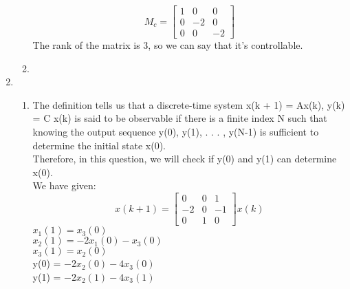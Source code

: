 \documentclass[12pt,a4paper, margin=1in]{article}
\begin{document}
\begin{enumerate}
\begin{enumerate}
            \begin{equation*}
            M_c=
            \begin{bmatrix}
                1 & 0 & 0\\
                0 & -2 & 0\\
                0 & 0 & -2
            \end{bmatrix}
            \end{equation*}
            The rank of the matrix is 3, so we can say that it's controllable.
            
            \item 
        \end{enumerate}
        
    \newpage
    
    \item %
        \begin{enumerate}
            \item The definition tells us that a discrete-time system x(k + 1) = Ax(k), y(k) = C x(k) is said to be observable if there is a finite index N such that knowing the output sequence y(0), y(1), . . . , y(N-1) is sufficient to determine the initial state x(0).\\
            Therefore, in this question, we will check if y(0) and y(1) can determine x(0).\\
            
            We have given:\\
            \begin{equation*}
            x(k+1)
            =
            \begin{bmatrix}
                0 & 0 & 1\\
                -2 & 0 & -1\\
                0 & 1 & 0
            \end{bmatrix}
            x(k)
            \end{equation*}
            $x_1(1) = x_3(0)$\\
            $x_2(1) = -2x_1(0)-x_3(0)$\\
            $x_3(1) = x_2(0)$\\

            y(0) = $-2x_2(0)-4x_3(0)$\\
            y(1) = $-2x_2(1)-4x_3(1)$\\
            

\end{enumerate}
\end{enumerate}
\end{document}
